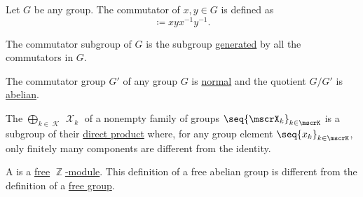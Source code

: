 \begin{definition}\label{def:group_commutator}
  Let \( G \) be any group. The commutator of \( x, y \in G \) is defined as
  \begin{equation*}
    [x, y] \coloneqq xyx^{-1}y^{-1}.
  \end{equation*}

  The commutator subgroup of \( G \) is the subgroup \hyperref[def:group_presentation]{generated} by all the commutators in \( G \).
\end{definition}

\begin{proposition}\label{thm:quotient_by_commutator_subgroup}
  The commutator group \( G' \) of any group \( G \) is \hyperref[def:normal_subgroup]{normal} and the quotient \( G / G' \) is \hyperref[def:abelian_group]{abelian}.
\end{proposition}

\begin{definition}\label{def:group_direct_sum}
  The  \( \bigoplus_{k \in \mscrK} \mscrX_k \) of a nonempty family of groups \( \seq{ \mscrX_k }_{k \in \mscrK} \) is a subgroup of their \hyperref[def:group_direct_sum]{direct product} where, for any group element \( \seq{ x_k }_{k \in \mscrK} \), only finitely many components are different from the identity.
\end{definition}

\begin{definition}\label{def:free_abelian_group}
  A  is a \hyperref[def:free_left_module]{free} \hyperref[thm:abelian_group_iff_z_module]{\( \BbbZ \)-module}. This definition of a free abelian group is different from the definition of a \hyperref[def:free_group]{free group}.
\end{definition}
